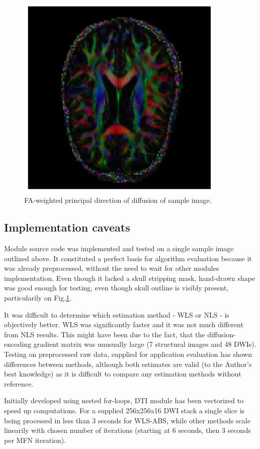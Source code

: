 \begin{figure}[H]
	\includegraphics[width=10cm]{figures/Module_06/fa_rgb}
	\centering
	\caption{FA-weighted principal direction of diffusion of sample image.}
	\label{fig:m6_pic_5}
\end{figure}

\subsection{Implementation caveats}

Module source code was implemented and tested on a single sample image outlined above. It constituted a perfect basis for algorithm evaluation because it was already preprocessed, without the need to wait for other modules implementation. Even though it lacked a skull stripping mask, hand-drawn shape was good enough for testing, even though skull outline is visibly present, particularily on Fig.\ref{fig:m6_pic_5}. 

It was difficult to determine which estimation method - WLS or NLS - is objectively better. WLS was significantly faster and it was not much different from NLS results. This might have been due to the fact, that the diffusion-encoding gradient matrix was unusually large (7 structural images and 48 DWIs). Testing on preprocessed raw data, supplied for application evaluation has shown differences between methods, although both estimates are valid (to the Author's best knowledge) as it is difficult to compare any estimation methods without reference.

Initially developed using nested for-loops, DTI module has been vectorized to speed up computations. For a supplied 256x256x16 DWI stack a single slice is being processed in less than 3 seconds for WLS-ABS, while other methods scale linearily with chosen number of iterations (starting at 6 seconds, then 3 seconds per MFN iteration).

